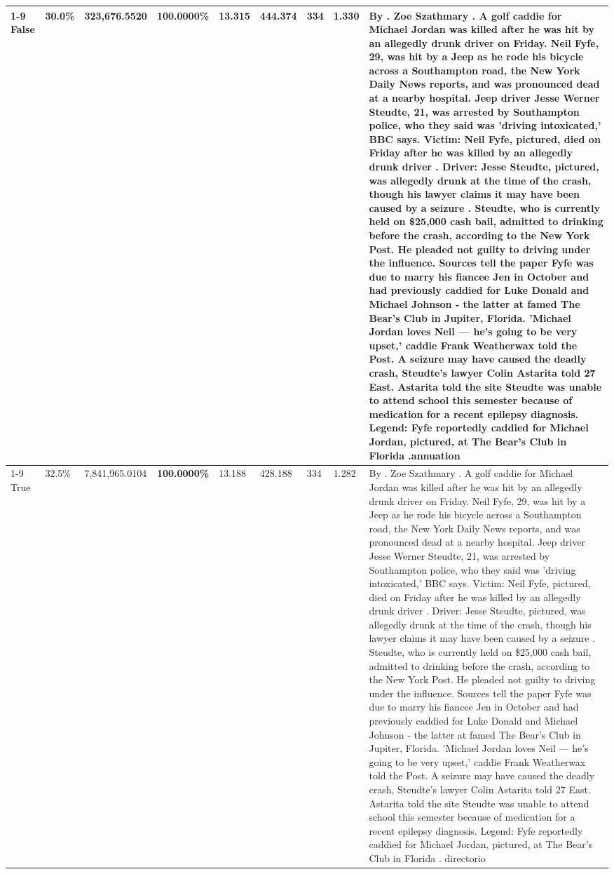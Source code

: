 \begin{table}[H]
\begin{tabular}{lllrlllll}
\cline{1-9}
False & 30.0\% & 323,676.5520 & \bfseries \color{red} 100.0000\% & 13.315 & 444.374 & 334 & 1.330 & By . Zoe Szathmary . A golf caddie for Michael Jordan was killed after he was hit by an allegedly drunk driver on Friday. Neil Fyfe, 29, was hit by a Jeep as he rode his bicycle across a Southampton road, the New York Daily News reports, and was pronounced dead at a nearby hospital. Jeep driver Jesse Werner Steudte, 21, was arrested by Southampton police, who they said was 'driving intoxicated,' BBC says. Victim: Neil Fyfe, pictured, died on Friday after he was killed by an allegedly drunk driver . Driver: Jesse Steudte, pictured, was allegedly drunk at the time of the crash, though his lawyer claims it may have been caused by a seizure . Steudte, who is currently held on \$25,000 cash bail, admitted to drinking before the crash, according to the New York Post. He pleaded not guilty to driving under the influence. Sources tell the paper Fyfe was due to marry his fiancee Jen in October and had previously caddied for Luke Donald and Michael Johnson - the latter at famed The Bear's Club in Jupiter, Florida. 'Michael Jordan loves Neil — he’s going to be very upset,' caddie Frank Weatherwax told the Post. A seizure may have caused the deadly crash, Steudte's lawyer Colin Astarita told 27 East. Astarita told the site Steudte was unable to attend school this semester because of medication for a recent epilepsy diagnosis. Legend: Fyfe reportedly caddied for Michael Jordan, pictured, at The Bear's Club in Florida .annuation \\
\cline{1-9}
True & 32.5\% & 7,841,965.0104 & \bfseries \color{red} 100.0000\% & 13.188 & 428.188 & 334 & 1.282 & By . Zoe Szathmary . A golf caddie for Michael Jordan was killed after he was hit by an allegedly drunk driver on Friday. Neil Fyfe, 29, was hit by a Jeep as he rode his bicycle across a Southampton road, the New York Daily News reports, and was pronounced dead at a nearby hospital. Jeep driver Jesse Werner Steudte, 21, was arrested by Southampton police, who they said was 'driving intoxicated,' BBC says. Victim: Neil Fyfe, pictured, died on Friday after he was killed by an allegedly drunk driver . Driver: Jesse Steudte, pictured, was allegedly drunk at the time of the crash, though his lawyer claims it may have been caused by a seizure . Steudte, who is currently held on \$25,000 cash bail, admitted to drinking before the crash, according to the New York Post. He pleaded not guilty to driving under the influence. Sources tell the paper Fyfe was due to marry his fiancee Jen in October and had previously caddied for Luke Donald and Michael Johnson - the latter at famed The Bear's Club in Jupiter, Florida. 'Michael Jordan loves Neil — he’s going to be very upset,' caddie Frank Weatherwax told the Post. A seizure may have caused the deadly crash, Steudte's lawyer Colin Astarita told 27 East. Astarita told the site Steudte was unable to attend school this semester because of medication for a recent epilepsy diagnosis. Legend: Fyfe reportedly caddied for Michael Jordan, pictured, at The Bear's Club in Florida . directorio \\

\end{tabular}
\end{table}
